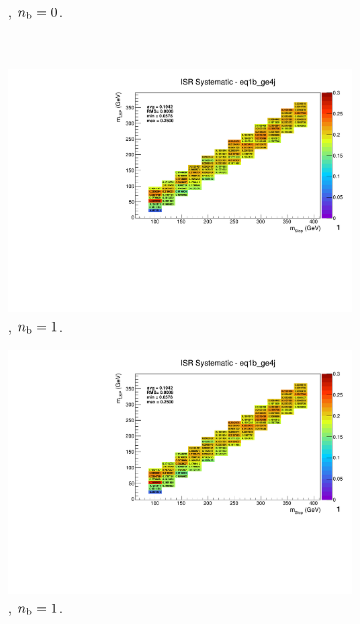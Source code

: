 \begin{figure}[ht!]
\begin{subfigure}[b]{0.32\textwidth}
    \caption{\njhigh, $n_{\text{b}} = 0$.}
  \end{subfigure}\\
  \begin{subfigure}[b]{0.32\textwidth}
    \includegraphics[width=\textwidth, page=12]{Figs/sms/t2degen/v19/systs_v2/T2_4body_ISR_eq1b_ge4j.pdf}
    \caption{\njhigh, $n_{\text{b}} = 1$.}
  \end{subfigure}
  \begin{subfigure}[b]{0.32\textwidth}
    \includegraphics[width=\textwidth, page=8]{Figs/sms/t2degen/v19/systs_v2/T2_4body_ISR_eq1b_ge4j.pdf}
    \caption{\njhigh, $n_{\text{b}} = 1$.}
  \end{subfigure}
  \begin{subfigure}[b]{0.32\textwidth}

\end{subfigure}
\end{figure}
